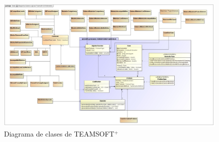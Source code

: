\newpage
{}
\recalctypearea
\pagestyle{plain}
	\begin{figure}[H]
\hspace{-3.2cm}
		\includegraphics[width=1.3\textwidth]{figuras/diagrama-clases-teamsoft.jpg}
		\caption{Diagrama de clases de TEAMSOFT$^+$}\label{fig:diag-clases}
	\end{figure}
\newpage
{}
\recalctypearea
\pagestyle{fancy}
%
%
